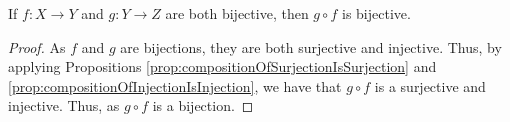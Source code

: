 \guard





\begin{prop}
\label{prop:compositionOfBijectionsIsBijection}
  If $f:X\to Y$ and $g:Y\to Z$ are both bijective, then $g\circ f$ is bijective.
\end{prop}
\begin{proof}
  As $f$ and $g$ are bijections, they are both surjective and injective.
  Thus, by applying Propositions \ref{prop:compositionOfSurjectionIsSurjection} and \ref{prop:compositionOfInjectionIsInjection}, we have that $g\circ f$ is a surjective and injective.
  Thus, as $g\circ f$ is a bijection.
\end{proof}
